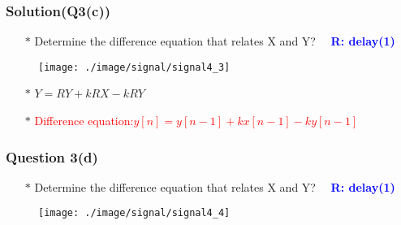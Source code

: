 \documentclass{beamer}
\newcommand{\blue}[1]{\textcolor{blue}{#1}}
\newcommand{\red}[1]{\textcolor{red}{#1}}
\begin{document}

\begin{frame}
\frametitle{Solution(Q3(c))}

\begin{itemize} \itemsep1pt \parskip0pt 
  \item[$\ast$] Determine the difference equation that relates X and Y?  ~~\blue{\bf R: delay(1)}
\end{itemize}
\vspace{10 mm}


\begin{figure}[H]
  \centering
  \texttt{[image: ./image/signal/signal4\_3]}
\end{figure}
\vspace{10 mm}

\begin{itemize} \itemsep1pt \parskip0pt 
  \item[$\ast$] $Y = RY + kRX - kRY$
  \item[$\ast$] \red{Difference equation:$y[n] = y[n-1] + kx[n-1] - ky[n-1]$}
\end{itemize}

\end{frame}


\begin{frame}
\frametitle{Question 3(d)}

\begin{itemize} \itemsep1pt \parskip0pt 
  \item[$\ast$] Determine the difference equation that relates X and Y?  ~~\blue{\bf R: delay(1)}
\end{itemize}
\vspace{10 mm}


\begin{figure}[H]
  \centering
  \texttt{[image: ./image/signal/signal4\_4]}
\end{figure}


\end{frame}

\end{document}
